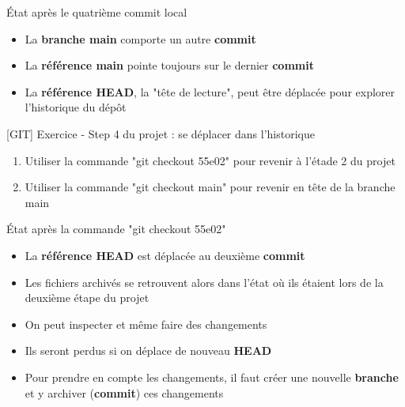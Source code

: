 \documentclass[a4paper,11pt]{beamer}
\newcounter{exampleBlockCounter}
\begin{document}
\begin{frame}
\begin{block}{État après le quatrième commit local}
\centering
{}
\begin{itemize}
	\item La \textbf{branche main} comporte un autre \textbf{commit}
	\item La \textbf{référence main} pointe toujours sur le dernier \textbf{commit}
	\item La \textbf{référence HEAD}, la "tête de lecture", peut être déplacée pour explorer l'historique du dépôt
\end{itemize}
\end{block}
\begin{exampleblock}{[GIT] Exercice  - Step 4 du projet : se déplacer dans l'historique} 
\begin{enumerate}
    \item Utiliser la commande "git checkout 55e02" pour revenir à l'étade 2 du projet
    \item Utiliser la commande "git checkout main" pour revenir en tête de la branche main
\end{enumerate}
\end{exampleblock}
\end{frame}

\begin{frame}
\begin{block}{État après la commande "git checkout 55e02"}
\centering
{}
\begin{itemize}
	\item La \textbf{référence HEAD} est déplacée au deuxième \textbf{commit}
	\item Les fichiers archivés se retrouvent alors dans l'état où ils étaient lors de la deuxième étape du projet
	\item On peut inspecter et même faire des changements
	\item Ils seront perdus si on déplace de nouveau \textbf{HEAD}
	\item Pour prendre en compte les changements, il faut créer une nouvelle \textbf{branche} et y archiver (\textbf{commit}) ces changements 
\end{itemize}
\end{block}
\end{frame}
\end{document}
